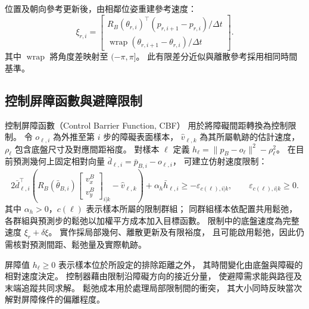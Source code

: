位置及朝向參考更新後，由相鄰位姿重建參考速度：
\begin{equation}
    \xi_{r,i}=
    \begin{bmatrix}
        R_B(\theta_{r,i})^\top
        (p_{r,i+1}-p_{r,i})/\Delta t\\
        \operatorname{wrap}(\theta_{r,i+1}-\theta_{r,i})/\Delta t
    \end{bmatrix}.
    \label{eq:ch3_reference_velocity_reconstruction}
\end{equation}
其中 $\operatorname{wrap}$ 將角度差映射至 $(-\pi,\pi]$。
此有限差分近似與離散參考採用相同時間基準。

\subsection{控制屏障函數與避障限制}
\label{subsec:cbf_obstacle_constraints}

控制屏障函數（Control Barrier Function, CBF）
用於將障礙間距轉換為控制限制\cite{ames2019cbf}。
令 $o_{\ell,i}$ 為外推至第 $i$ 步的障礙表面樣本，
$\hat v_{\ell,k}$ 為其所屬軌跡的估計速度，
$\rho_\ell$ 包含底盤尺寸及對應間距裕度。
對樣本 $\ell$ 定義
$h_\ell=\|p_B-o_\ell\|^2-\rho_\ell^2$。
在目前預測幾何上固定相對向量
$\bar d_{\ell,i}=\bar p_{B,i}-o_{\ell,i}$，
可建立仿射速度限制：
\begin{equation}
    2\bar d_{\ell,i}^{\top}
    \left(R_B(\bar\theta_{B,i})
    \begin{bmatrix}v_x^B\\v_y^B\end{bmatrix}_{i|k}
    -\hat v_{\ell,k}\right)
    +\alpha_h\bar h_{\ell,i}
    \geq-\varepsilon_{c(\ell),i|k},
    \qquad \varepsilon_{c(\ell),i|k}\geq0 .
    \label{eq:ch3_cbf_affine_constraint}
\end{equation}
其中 $\alpha_h>0$，$c(\ell)$ 表示樣本所屬的限制群組；
同群組樣本依配置共用鬆弛，
各群組與預測步的鬆弛以加權平方成本加入目標函數。
限制中的底盤速度為完整速度 $\xi_r+\delta\xi$。
實作採局部幾何、離散更新及有限裕度，
且可能啟用鬆弛，因此仍需核對預測間距、鬆弛量及實際軌跡。

屏障值 $h_\ell\geq0$ 表示樣本位於所設定的排除距離之外，
其時間變化由底盤與障礙的相對速度決定。
控制器藉由限制沿障礙方向的接近分量，
使避障需求能與路徑及末端追蹤共同求解。
鬆弛成本用於處理局部限制間的衝突，
其大小同時反映當次解對屏障條件的偏離程度。

